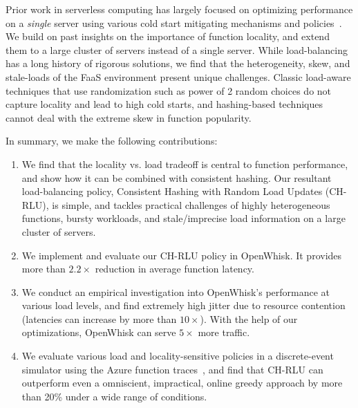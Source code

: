 Prior work in serverless computing has largely focused on optimizing performance on a \emph{single} server using various cold start mitigating mechanisms and policies~\cite{vhive-asplos21,faascache-asplos21}. 
We build on past insights on the importance of function locality, and extend them to a large cluster of servers instead of a single server. 
While load-balancing has a long history of rigorous solutions, we find that the heterogeneity, skew, and stale-loads of the FaaS environment present unique challenges. 
Classic load-aware techniques that use randomization such as power of 2 random choices do not capture locality and lead to high cold starts, and hashing-based techniques cannot deal with the extreme skew in function popularity.



In summary, we make the following contributions:

\begin{enumerate}
\item We find that the locality vs. load tradeoff is central to function performance, and show how it can be combined with consistent hashing. Our resultant load-balancing policy, Consistent Hashing with Random Load Updates (CH-RLU), is simple, and tackles practical challenges of highly heterogeneous functions, bursty workloads, and stale/imprecise load information on a large cluster of servers.
\item We implement and evaluate our CH-RLU policy in OpenWhisk. It provides more than $2.2\times$ reduction in average function latency.
\item We conduct an empirical investigation into OpenWhisk's performance at various load levels, and find extremely high jitter due to resource contention (latencies can increase by more than $10\times$).
  With the help of our optimizations, OpenWhisk can serve $5\times$ more traffic. 
\item We evaluate various load and locality-sensitive policies in a discrete-event simulator using the Azure function traces~\cite{shahrad_serverless_2020}, and find that CH-RLU can outperform even a omniscient, impractical, online greedy approach by more than 20\% under a wide range of conditions. 
\end{enumerate}

